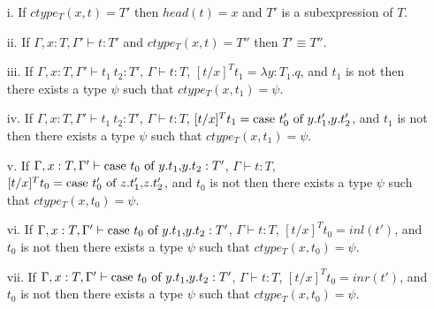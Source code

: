 \begin{lemma}
  \label{lemma:ctype_props_ssfp}
  \small
  \begin{itemize}
  \item[i.] If $ctype_T(x,t) = T'$ then $head(t) = x$ and $T'$ 
    is a subexpression of $T$.
    
  \item[ii.] If $\Gamma,x:T,\Gamma' \vdash t:T'$ and $ctype_T(x,t) = T''$ then
    $T' \equiv T''$.

  \item[iii.] If $\Gamma,x:T,\Gamma' \vdash t_1\ t_2:T'$, $\Gamma \vdash t:T$,
    $[t/x]^T t_1 = \lambda y:T_1.q$, and $t_1$ is not then there exists a type
    $\psi$ such that $ctype_T(x,t_1) = \psi$.

  \item[iv.] If $\Gamma,x:T,\Gamma' \vdash t_1\ t_2:T'$, $\Gamma \vdash t:T$,
    $[t/x]^T t_1 = \mbox{case}\ t'_0\ \text{of}\ y\text{.}t'_1\text{,}y\text{.}t'_2$, and $t_1$ is not then there exists a type
    $\psi$ such that $ctype_T(x,t_1) = \psi$.

  \item[v.] If $\Gamma,x:T,\Gamma' \vdash \mbox{case}\ t_0\ \text{of}\ y\text{.}t_1\text{,}y\text{.}t_2:T'$, 
    $\Gamma \vdash t:T$, $[t/x]^T t_0 = \mbox{case}\ t'_0\ \text{of}\ z\text{.}t'_1\text{,}z\text{.}t'_2$, and 
    $t_0$ is not then there exists a type $\psi$ such that $ctype_T(x,t_0) = \psi$.

  \item[vi.] If $\Gamma,x:T,\Gamma' \vdash \mbox{case}\ t_0\ \text{of}\ y\text{.}t_1\text{,}y\text{.}t_2:T'$, 
    $\Gamma \vdash t:T$, $[t/x]^T t_0 = inl(t')$, and $t_0$ is not then there 
    exists a type $\psi$ such that $ctype_T(x,t_0) = \psi$.

  \item[vii.] If $\Gamma,x:T,\Gamma' \vdash \mbox{case}\ t_0\ \text{of}\ y\text{.}t_1\text{,}y\text{.}t_2:T'$, 
    $\Gamma \vdash t:T$, $[t/x]^T t_0 = inr(t')$, and $t_0$ is not then 
    there exists a type $\psi$ such that $ctype_T(x,t_0) = \psi$.
  \end{itemize}
\end{lemma}
